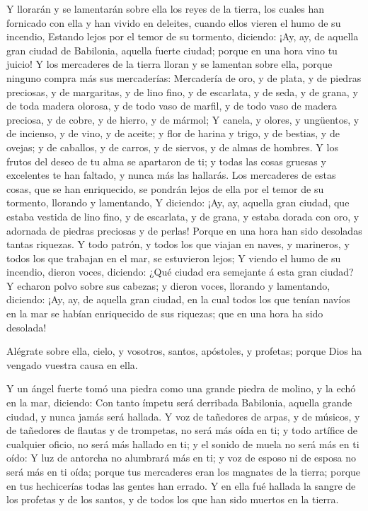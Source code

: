 Y llorarán y se lamentarán sobre ella los reyes de la
tierra, los cuales han fornicado con ella y han vivido en deleites,
cuando ellos vieren el humo de su incendio,  Estando lejos
por el temor de su tormento, diciendo: ¡Ay, ay, de aquella gran ciudad
de Babilonia, aquella fuerte ciudad; porque en una hora vino tu juicio!
 Y los mercaderes de la tierra lloran y se lamentan sobre
ella, porque ninguno compra más sus mercaderías: 
Mercadería de oro, y de plata, y de piedras preciosas, y de margaritas,
y de lino fino, y de escarlata, y de seda, y de grana, y de toda madera
olorosa, y de todo vaso de marfil, y de todo vaso de madera preciosa, y
de cobre, y de hierro, y de mármol;  Y canela, y olores, y
ungüentos, y de incienso, y de vino, y de aceite; y flor de harina y
trigo, y de bestias, y de ovejas; y de caballos, y de carros, y de
siervos, y de almas de hombres.  Y los frutos del deseo de
tu alma se apartaron de ti; y todas las cosas gruesas y excelentes te
han faltado, y nunca más las hallarás.  Los mercaderes de
estas cosas, que se han enriquecido, se pondrán lejos de ella por el
temor de su tormento, llorando y lamentando,  Y diciendo:
¡Ay, ay, aquella gran ciudad, que estaba vestida de lino fino, y de
escarlata, y de grana, y estaba dorada con oro, y adornada de piedras
preciosas y de perlas!  Porque en una hora han sido
desoladas tantas riquezas. Y todo patrón, y todos los que viajan en
naves, y marineros, y todos los que trabajan en el mar, se estuvieron
lejos;  Y viendo el humo de su incendio, dieron voces,
diciendo: ¿Qué ciudad era semejante á esta gran ciudad?  Y
echaron polvo sobre sus cabezas; y dieron voces, llorando y lamentando,
diciendo: ¡Ay, ay, de aquella gran ciudad, en la cual todos los que
tenían navíos en la mar se habían enriquecido de sus riquezas; que en
una hora ha sido desolada!

 Alégrate sobre ella, cielo, y vosotros, santos, apóstoles,
y profetas; porque Dios ha vengado vuestra causa en ella.

 Y un ángel fuerte tomó una piedra como una grande piedra
de molino, y la echó en la mar, diciendo: Con tanto ímpetu será
derribada Babilonia, aquella grande ciudad, y nunca jamás será hallada.
 Y voz de tañedores de arpas, y de músicos, y de tañedores
de flautas y de trompetas, no será más oída en ti; y todo artífice de
cualquier oficio, no será más hallado en ti; y el sonido de muela no
será más en ti oído:  Y luz de antorcha no alumbrará más en
ti; y voz de esposo ni de esposa no será más en ti oída; porque tus
mercaderes eran los magnates de la tierra; porque en tus hechicerías
todas las gentes han errado.  Y en ella fué hallada la
sangre de los profetas y de los santos, y de todos los que han sido
muertos en la tierra.

